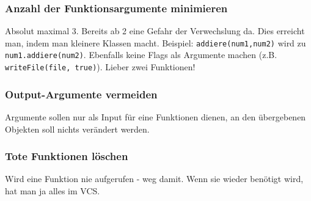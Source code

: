 \subsubsection{Anzahl der Funktionsargumente minimieren}
Absolut maximal 3. Bereits ab 2 eine Gefahr der Verwechslung da. Dies erreicht man, indem man kleinere Klassen macht. Beispiel: \texttt{addiere(num1,num2)} wird zu \texttt{num1.addiere(num2)}. Ebenfalls keine Flags als Argumente machen (z.B. \texttt{writeFile(file, true)}). Lieber zwei Funktionen!

\subsubsection{Output-Argumente vermeiden}
Argumente sollen nur als Input für eine Funktionen dienen, an den übergebenen Objekten soll nichts verändert werden.

\subsubsection{Tote Funktionen löschen}
Wird eine Funktion nie aufgerufen - weg damit. Wenn sie wieder benötigt wird, hat man ja alles im \ac{VCS}.